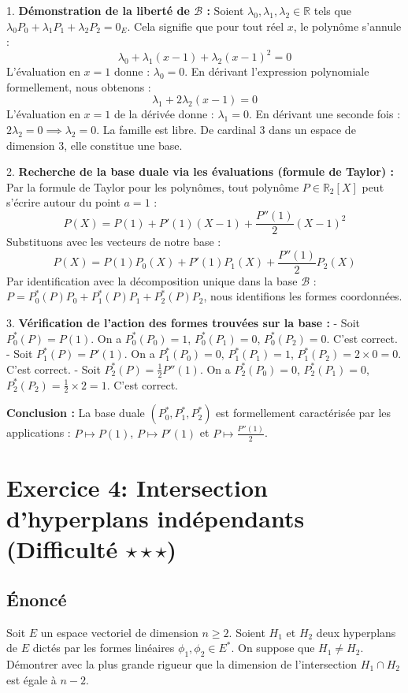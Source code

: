\documentclass[11pt,a4paper]{report}
\begin{document}
1. \textbf{Démonstration de la liberté de $\mathcal{B}$ :}
   Soient $\lambda_0, \lambda_1, \lambda_2 \in \mathbb{R}$ tels que $\lambda_0 P_0 + \lambda_1 P_1 + \lambda_2 P_2 = 0_E$.
   Cela signifie que pour tout réel $x$, le polynôme s'annule :
   $$\lambda_0 + \lambda_1(x-1) + \lambda_2(x-1)^2 = 0$$
   L'évaluation en $x=1$ donne : $\lambda_0 = 0$.
   En dérivant l'expression polynomiale formellement, nous obtenons :
   $$\lambda_1 + 2\lambda_2(x-1) = 0$$
   L'évaluation en $x=1$ de la dérivée donne : $\lambda_1 = 0$.
   En dérivant une seconde fois : $2\lambda_2 = 0 \implies \lambda_2 = 0$.
   La famille est libre. De cardinal 3 dans un espace de dimension 3, elle constitue une base.

2. \textbf{Recherche de la base duale via les évaluations (formule de Taylor) :}
   Par la formule de Taylor pour les polynômes, tout polynôme $P \in \mathbb{R}_2[X]$ peut s'écrire autour du point $a=1$ :
   $$P(X) = P(1) + P'(1)(X-1) + \frac{P''(1)}{2}(X-1)^2$$
   Substituons avec les vecteurs de notre base :
   $$P(X) = P(1) P_0(X) + P'(1) P_1(X) + \frac{P''(1)}{2} P_2(X)$$
   Par identification avec la décomposition unique dans la base $\mathcal{B}$ : $P = P_0^*(P) P_0 + P_1^*(P) P_1 + P_2^*(P) P_2$, nous identifions les formes coordonnées.

3. \textbf{Vérification de l'action des formes trouvées sur la base :}
   - Soit $P_0^*(P) = P(1)$. On a $P_0^*(P_0) = 1$, $P_0^*(P_1) = 0$, $P_0^*(P_2) = 0$. C'est correct.
   - Soit $P_1^*(P) = P'(1)$. On a $P_1^*(P_0) = 0$, $P_1^*(P_1) = 1$, $P_1^*(P_2) = 2 \times 0 = 0$. C'est correct.
   - Soit $P_2^*(P) = \frac{1}{2}P''(1)$. On a $P_2^*(P_0) = 0$, $P_2^*(P_1) = 0$, $P_2^*(P_2) = \frac{1}{2} \times 2 = 1$. C'est correct.

\textbf{Conclusion :}
La base duale $(P_0^*, P_1^*, P_2^*)$ est formellement caractérisée par les applications : $P \mapsto P(1)$, $P \mapsto P'(1)$ et $P \mapsto \frac{P''(1)}{2}$.

\section{Exercice 4: Intersection d'hyperplans indépendants (Difficulté $\star \star \star$)}

\subsection{Énoncé}
Soit $E$ un espace vectoriel de dimension $n \ge 2$. Soient $H_1$ et $H_2$ deux hyperplans de $E$ dictés par les formes linéaires $\phi_1, \phi_2 \in E^*$. On suppose que $H_1 \neq H_2$. Démontrer avec la plus grande rigueur que la dimension de l'intersection $H_1 \cap H_2$ est égale à $n-2$.
\end{document}
